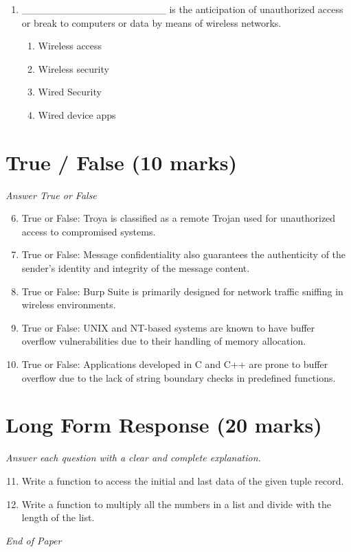 \documentclass[12pt]{article}
\begin{document}
\begin{enumerate}[label=\arabic*.]
\begin{enumerate}[label=(\alph*)]
    \item Surface web
    \item Deep Web
\end{enumerate}
\item \_\_\_\_\_\_\_\_\_\_\_\_\_\_\_\_\_\_\_\_ is the anticipation of unauthorized access or break to computers or data by means of wireless networks.
\begin{enumerate}[label=(\alph*)]
    \item Wireless access
    \item Wireless security
    \item Wired Security
    \item Wired device apps
\end{enumerate}
\end{enumerate}

\section*{True / False (10 marks)}
\textit{Answer True or False}
\begin{enumerate}[label=\arabic*.]
\setcounter{enumi}{5}
\item True or False: Troya is classified as a remote Trojan used for unauthorized access to compromised systems.
\item True or False: Message confidentiality also guarantees the authenticity of the sender's identity and integrity of the message content.
\item True or False: Burp Suite is primarily designed for network traffic sniffing in wireless environments.
\item True or False: UNIX and NT-based systems are known to have buffer overflow vulnerabilities due to their handling of memory allocation.
\item True or False: Applications developed in C and C++ are prone to buffer overflow due to the lack of string boundary checks in predefined functions.
\end{enumerate}

\section*{Long Form Response (20 marks)}
\textit{Answer each question with a clear and complete explanation.}
\begin{enumerate}[label=\arabic*.]
\setcounter{enumi}{10}
\item Write a function to access the initial and last data of the given tuple record.
\item Write a function to multiply all the numbers in a list and divide with the length of the list.
\end{enumerate}

\vfill
\noindent\textit{End of Paper}
\end{document}
